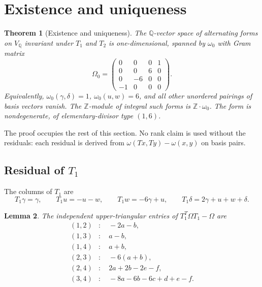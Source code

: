 \documentclass[11pt,a4paper]{article}
\newtheorem{theorem}{Theorem}
\newtheorem{lemma}[theorem]{Lemma}
\theoremstyle{definition}
\theoremstyle{remark}
\newcommand{\Q}{\mathbb{Q}}
\newcommand{\Z}{\mathbb{Z}}
\begin{document}
\section{Existence and uniqueness}

\begin{theorem}[Existence and uniqueness]\label{thm:A}
The $\Q$-vector space of alternating forms on $V_{\Q}$ invariant under $T_1$ and $T_2$ is one-dimensional, spanned by $\omega_0$ with Gram matrix
\[
\Omega_0=\begin{pmatrix}0&0&0&1\\0&0&6&0\\0&-6&0&0\\-1&0&0&0\end{pmatrix}.
\]
Equivalently, $\omega_0(\gamma,\delta)=1$, $\omega_0(u,w)=6$, and all other unordered pairings of basis vectors vanish. The $\Z$-module of integral such forms is $\Z\cdot\omega_0$. The form is nondegenerate, of elementary-divisor type $(1,6)$.
\end{theorem}

The proof occupies the rest of this section. No rank claim is used without the residuals: each residual is derived from $\omega(Tx,Ty)-\omega(x,y)$ on basis pairs.

\subsection{Residual of $T_1$}

The columns of $T_1$ are
\[
T_1\gamma=\gamma,\qquad T_1u=-u-w,\qquad T_1w=-6\gamma+u,\qquad T_1\delta=2\gamma+u+w+\delta.
\]

\begin{lemma}\label{lem:T1res}
The independent upper-triangular entries of $T_1^T\Omega T_1-\Omega$ are
\begin{align*}
(1,2)&:\quad -2a-b,\\
(1,3)&:\quad a-b,\\
(1,4)&:\quad a+b,\\
(2,3)&:\quad -6(a+b),\\
(2,4)&:\quad 2a+2b-2e-f,\\
(3,4)&:\quad -8a-6b-6c+d+e-f.
\end{align*}
\end{lemma}
\end{document}
